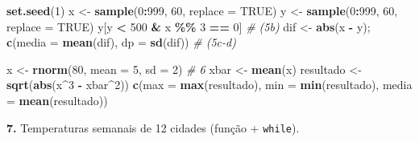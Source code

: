 \documentclass[
  portuguese,
  11pt,
  openany]{book}
\newenvironment{Shaded}{\begin{snugshade}}{\end{snugshade}}
\newcommand{\AttributeTok}[1]{\textcolor[rgb]{0.13,0.29,0.53}{#1}}
\newcommand{\CommentTok}[1]{\textcolor[rgb]{0.56,0.35,0.01}{\textit{#1}}}
\newcommand{\ConstantTok}[1]{\textcolor[rgb]{0.56,0.35,0.01}{#1}}
\newcommand{\DecValTok}[1]{\textcolor[rgb]{0.00,0.00,0.81}{#1}}
\newcommand{\FunctionTok}[1]{\textcolor[rgb]{0.13,0.29,0.53}{\textbf{#1}}}
\newcommand{\NormalTok}[1]{#1}
\newcommand{\OtherTok}[1]{\textcolor[rgb]{0.56,0.35,0.01}{#1}}
\newcommand{\SpecialCharTok}[1]{\textcolor[rgb]{0.81,0.36,0.00}{\textbf{#1}}}
\newcommand{\StringTok}[1]{\textcolor[rgb]{0.31,0.60,0.02}{#1}}
\begin{document}
\begin{Shaded}
\begin{Highlighting}[]
\FunctionTok{set.seed}\NormalTok{(}\DecValTok{1}\NormalTok{)}
\NormalTok{x }\OtherTok{\textless{}{-}} \FunctionTok{sample}\NormalTok{(}\DecValTok{0}\SpecialCharTok{:}\DecValTok{999}\NormalTok{, }\DecValTok{60}\NormalTok{, }\AttributeTok{replace =} \ConstantTok{TRUE}\NormalTok{)}
\NormalTok{y }\OtherTok{\textless{}{-}} \FunctionTok{sample}\NormalTok{(}\DecValTok{0}\SpecialCharTok{:}\DecValTok{999}\NormalTok{, }\DecValTok{60}\NormalTok{, }\AttributeTok{replace =} \ConstantTok{TRUE}\NormalTok{)}
\NormalTok{y[y }\SpecialCharTok{\textless{}} \DecValTok{500} \SpecialCharTok{\&}\NormalTok{ x }\SpecialCharTok{\%\%} \DecValTok{3} \SpecialCharTok{==} \DecValTok{0}\NormalTok{]                 }\CommentTok{\# (5b)}
\NormalTok{dif }\OtherTok{\textless{}{-}} \FunctionTok{abs}\NormalTok{(x }\SpecialCharTok{{-}}\NormalTok{ y); }\FunctionTok{c}\NormalTok{(}\AttributeTok{media =} \FunctionTok{mean}\NormalTok{(dif), }\AttributeTok{dp =} \FunctionTok{sd}\NormalTok{(dif))   }\CommentTok{\# (5c{-}d)}

\NormalTok{x }\OtherTok{\textless{}{-}} \FunctionTok{rnorm}\NormalTok{(}\DecValTok{80}\NormalTok{, }\AttributeTok{mean =} \DecValTok{5}\NormalTok{, }\AttributeTok{sd =} \DecValTok{2}\NormalTok{)         }\CommentTok{\# 6}
\NormalTok{xbar }\OtherTok{\textless{}{-}} \FunctionTok{mean}\NormalTok{(x)}
\NormalTok{resultado }\OtherTok{\textless{}{-}} \FunctionTok{sqrt}\NormalTok{(}\FunctionTok{abs}\NormalTok{(x}\SpecialCharTok{\^{}}\DecValTok{3} \SpecialCharTok{{-}}\NormalTok{ xbar}\SpecialCharTok{\^{}}\DecValTok{2}\NormalTok{))}
\FunctionTok{c}\NormalTok{(}\AttributeTok{max =} \FunctionTok{max}\NormalTok{(resultado), }\AttributeTok{min =} \FunctionTok{min}\NormalTok{(resultado), }\AttributeTok{media =} \FunctionTok{mean}\NormalTok{(resultado))}
\end{Highlighting}
\end{Shaded}

\textbf{7.} Temperaturas semanais de 12 cidades (função + \texttt{while}).

\begin{Shaded}
\end{Shaded}
\end{document}
